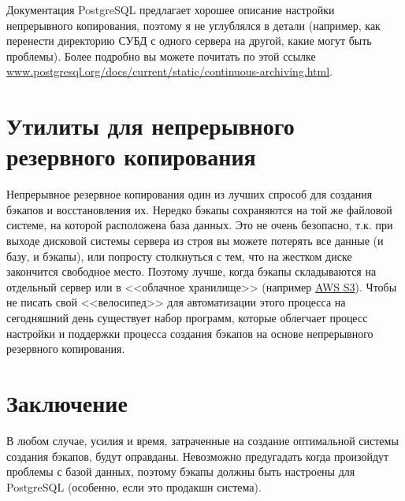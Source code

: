 Документация PostgreSQL предлагает хорошее описание настройки непрерывного копирования, поэтому я не углублялся в детали (например, как перенести директорию СУБД с одного сервера на другой, какие могут быть проблемы). Более подробно вы можете почитать по этой ссылке \href{http://www.postgresql.org/docs/current/static/continuous-archiving.html}{www.postgresql.org/docs/current/static/continuous-archiving.html}.

\section{Утилиты для непрерывного резервного копирования}

Непрерывное резервное копирования один из лучших спрособ для создания бэкапов и восстановления их. Нередко бэкапы сохраняются на той же файловой системе, на которой расположена база данных. Это не очень безопасно, т.к. при выходе дисковой системы сервера из строя вы можете потерять все данные (и базу, и бэкапы), или попросту столкнуться с тем, что на жестком диске закончится свободное место. Поэтому лучше, когда бэкапы складываются на отдельный сервер или в <<облачное хранилище>> (например \href{http://aws.amazon.com/s3/}{AWS S3}). Чтобы не писать свой <<велосипед>> для автоматизации этого процесса на сегодняшний день существует набор программ, которые облегчает процесс настройки и поддержки процесса создания бэкапов на основе непрерывного резервного копирования.




\section{Заключение}

В любом случае, усилия и время, затраченные на создание оптимальной системы создания бэкапов, будут оправданы. Невозможно предугадать когда произойдут проблемы с базой данных, поэтому бэкапы должны быть настроены для PostgreSQL (особенно, если это продакшн система).
